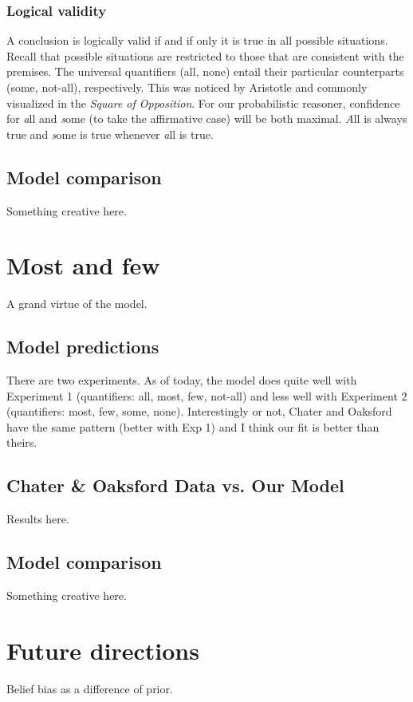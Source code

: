 \documentclass[10pt,letterpaper]{article}
\begin{document}
\subsubsection{Logical validity}
A conclusion is logically valid if and if only it is true in all possible situations. Recall that possible situations are restricted to those that are consistent with the premises. The universal quantifiers (all, none) entail their particular counterparts (some, not-all), respectively. This was noticed by Aristotle and commonly visualized in the \emph{Square of Opposition}. For our probabilistic reasoner, confidence for {\emph all} and {\emph some} (to take the affirmative case) will be both maximal. {\emph All} is always true and {\emph some} is true whenever {\emph all} is true.




\subsection{Model comparison}

Something creative here.

\section{Most and few}

A grand virtue of the model. 

\subsection{Model predictions}

There are two experiments. As of today, the model does quite well with Experiment 1 (quantifiers: all, most, few, not-all) and less well with Experiment 2 (quantifiers: most, few, some, none). Interestingly or not, Chater and Oaksford have the same pattern (better with Exp 1) and I think our fit is better than theirs.

\subsection{Chater \& Oaksford Data vs. Our Model}

Results here.

\subsection{Model comparison}

Something creative here.

\section{Future directions}

Belief bias as a difference of prior.



\setlength{\bibleftmargin}{.125in}
\setlength{\bibindent}{-\bibleftmargin}


\end{document}
